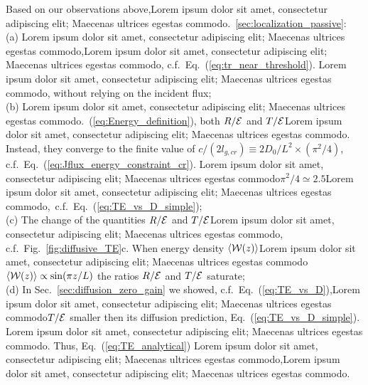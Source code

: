 
Based on our observations above,Lorem ipsum dolor sit amet, consectetur adipiscing elit; Maecenas ultrices egestas commodo.~\ref{sec:localization_passive}:\\
(a) Lorem ipsum dolor sit amet, consectetur adipiscing elit; Maecenas ultrices egestas commodo,Lorem ipsum dolor sit amet, consectetur adipiscing elit; Maecenas ultrices egestas commodo, c.f.~Eq.~(\ref{eq:tr_near_threshold}). Lorem ipsum dolor sit amet, consectetur adipiscing elit; Maecenas ultrices egestas commodo, without relying on the incident flux;\\
(b) Lorem ipsum dolor sit amet, consectetur adipiscing elit; Maecenas ultrices egestas commodo.~(\ref{eq:Energy_definition}), both $R/{\cal E}$  and $T/{\cal E}$Lorem ipsum dolor sit amet, consectetur adipiscing elit; Maecenas ultrices egestas commodo. Instead, they converge to the finite value of $c/(2l_{g,cr})\equiv 2D_0/L^2\times (\pi^2/4)$, c.f.~Eq.~(\ref{eq:Jflux_energy_constraint_cr}). Lorem ipsum dolor sit amet, consectetur adipiscing elit; Maecenas ultrices egestas commodo$\pi^2/4\simeq 2.5$Lorem ipsum dolor sit amet, consectetur adipiscing elit; Maecenas ultrices egestas commodo,~c.f.~Eq.~(\ref{eq:TE_vs_D_simple});\\
(c) The change of the quantities $R/{\cal E}$ and $T /{\cal E}$Lorem ipsum dolor sit amet, consectetur adipiscing elit; Maecenas ultrices egestas commodo, c.f.~Fig.~\ref{fig:diffusive_TE}c. When energy density $\langle {\cal W}(z)\rangle$Lorem ipsum dolor sit amet, consectetur adipiscing elit; Maecenas ultrices egestas commodo$\langle {\cal W}(z)\rangle\propto\sin(\pi z/L)$ the ratios $R/{\cal E}$  and $T/{\cal E}$ saturate;\\
(d) In Sec.~\ref{sec:diffusion_zero_gain} we showed, c.f.~Eq.~(\ref{eq:TE_vs_D}),Lorem ipsum dolor sit amet, consectetur adipiscing elit; Maecenas ultrices egestas commodo$T/{\cal E}$ smaller then its diffusion prediction, Eq.~(\ref{eq:TE_vs_D_simple}). Lorem ipsum dolor sit amet, consectetur adipiscing elit; Maecenas ultrices egestas commodo. Thus, Eq.~(\ref{eq:TE_analytical}) Lorem ipsum dolor sit amet, consectetur adipiscing elit; Maecenas ultrices egestas commodo,Lorem ipsum dolor sit amet, consectetur adipiscing elit; Maecenas ultrices egestas commodo.

